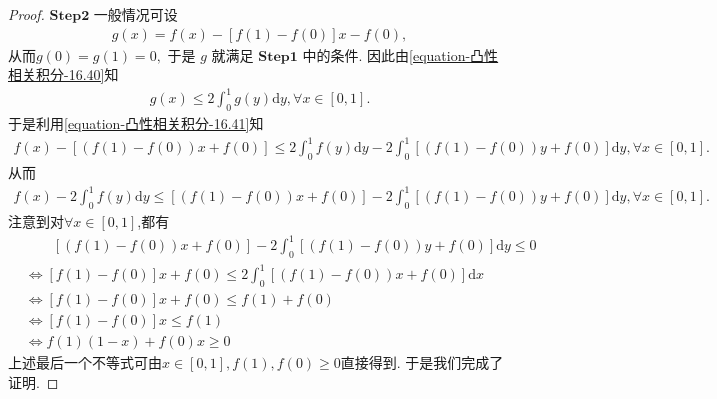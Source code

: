 \documentclass[../../main.tex]{subfiles}%
\begin{document}
\begin{proof}
$\mathbf{Step}\mathbf{2}$ 一般情况可设
\begin{align*}
g\left( x \right) =f\left( x \right) -\left[ f\left( 1 \right) -f\left( 0 \right) \right] x-f\left( 0 \right) ,
\end{align*}
从而$g(0)=g(1)=0,$
于是 $g$ 就满足 $\mathbf{Step}\mathbf{1}$ 中的条件. 因此由\eqref{equation-凸性相关积分-16.40}知
\begin{align}\label{equation-凸性相关积分-16.41}
g\left( x \right) \leqslant 2\int_0^1{g\left( y \right) \mathrm{d}y,}\forall x\in [0,1].
\end{align}
于是利用\eqref{equation-凸性相关积分-16.41}知
\begin{align*}
f\left( x \right) -\left[ \left( f\left( 1 \right) -f\left( 0 \right) \right) x+f\left( 0 \right) \right] \leqslant 2\int_0^1{f\left( y \right) \mathrm{d}y}-2\int_0^1{\left[ \left( f\left( 1 \right) -f\left( 0 \right) \right) y+f\left( 0 \right) \right] \mathrm{d}y},\forall x\in [0,1].
\end{align*}
从而
\begin{align*}
f\left( x \right) -2\int_0^1{f\left( y \right) \mathrm{d}y}\leqslant \left[ \left( f\left( 1 \right) -f\left( 0 \right) \right) x+f\left( 0 \right) \right] -2\int_0^1{\left[ \left( f\left( 1 \right) -f\left( 0 \right) \right) y+f\left( 0 \right) \right] \mathrm{d}y},\forall x\in [0,1].
\end{align*}
注意到对$\forall x\in [0,1]$,都有
\begin{align*}
&\quad \quad \left[ \left( f\left( 1 \right) -f\left( 0 \right) \right) x+f\left( 0 \right) \right] -2\int_0^1{\left[ \left( f\left( 1 \right) -f\left( 0 \right) \right) y+f\left( 0 \right) \right] \mathrm{d}y}\leqslant 0
\\
&\Leftrightarrow \left[ f\left( 1 \right) -f\left( 0 \right) \right] x+f\left( 0 \right) \leqslant 2\int_0^1{\left[ \left( f\left( 1 \right) -f\left( 0 \right) \right) x+f\left( 0 \right) \right] \mathrm{d}x}
\\
&\Leftrightarrow \left[ f\left( 1 \right) -f\left( 0 \right) \right] x+f\left( 0 \right) \leqslant f\left( 1 \right) +f\left( 0 \right) 
\\
&\Leftrightarrow \left[ f\left( 1 \right) -f\left( 0 \right) \right] x\leqslant f\left( 1 \right) 
\\
&\Leftrightarrow f\left( 1 \right) \left( 1-x \right) +f\left( 0 \right) x\geqslant 0
\end{align*}
上述最后一个不等式可由$x\in[0,1],f(1),f(0)\geqslant  0$直接得到.
于是我们完成了证明. 

\end{proof}
\end{document}
